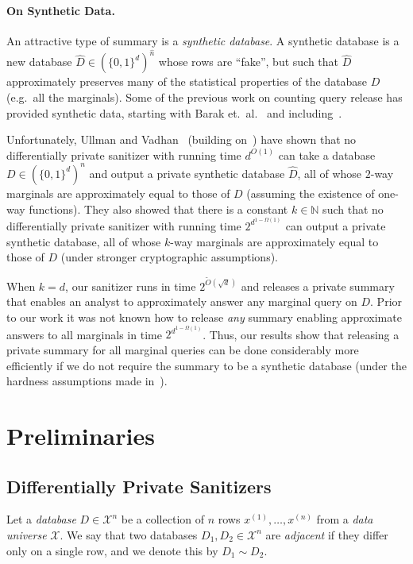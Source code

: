 \documentclass[11pt]{article}
\newcommand\N{\mathbb{N}}
\newcommand\cX{\mathcal{X}}
\newcommand\bits{\{0,1\}}
\theoremstyle{definition}
\begin{document}
\paragraph{On Synthetic Data.} An attractive type of summary is a \emph{synthetic database}.  A synthetic database is a new database $\widehat{D} \in (\bits^d)^{\widehat{n}}$ whose rows are ``fake'', but such that $\widehat{D}$ approximately preserves many of the statistical properties of the database $D$ (e.g.~all the marginals).  Some of the previous work on counting query release has provided synthetic data, starting with Barak et.~al.~\cite{BarakChDwKaMcTa07} and including~\cite{BlumLiRo08,DworkNaReRoVa09,DworkRoVa10,HardtLiMc10}.

Unfortunately, Ullman and Vadhan~\cite{UllmanVa11} (building on~\cite{DworkNaReRoVa09}) have shown that no differentially private sanitizer with running time $d^{O(1)}$ can take a database $D \in (\bits^d)^n$ and output a private synthetic database $\widehat{D}$, all of whose $2$-way marginals are approximately equal to those of $D$ (assuming the existence of one-way functions).  They also showed that there is a constant $k \in \N$ such that no differentially private sanitizer with running time $2^{d^{1-\Omega(1)}}$ can output a private synthetic database, all of whose $k$-way marginals are approximately equal to those of $D$ (under stronger cryptographic assumptions).

When $k = d$, our sanitizer runs in time $2^{\tilde{O}(\sqrt{d})}$ and releases a private summary that enables an analyst to approximately answer any marginal query on $D$.  Prior to our work it was not known how to release \emph{any} summary enabling approximate answers to all marginals in time $2^{d^{1-\Omega(1)}}$.  Thus, our results show that releasing a private summary for all marginal queries can be done considerably more efficiently if we do not require the summary to be a synthetic database (under the hardness assumptions made in~\cite{UllmanVa11}).
\section{Preliminaries}

\subsection{Differentially Private Sanitizers}\label{sec:sans}

Let a \emph{database} $D \in \cX^n$ be a collection of $n$ rows $x^{(1)}, \dots, x^{(n)}$ from a \emph{data universe} $\cX$.  We say that two databases $D_1,D_2 \in \cX^n$ are \emph{adjacent} if they differ only on a single row, and we denote this by $D_1 \sim D_2$.
\end{document}
